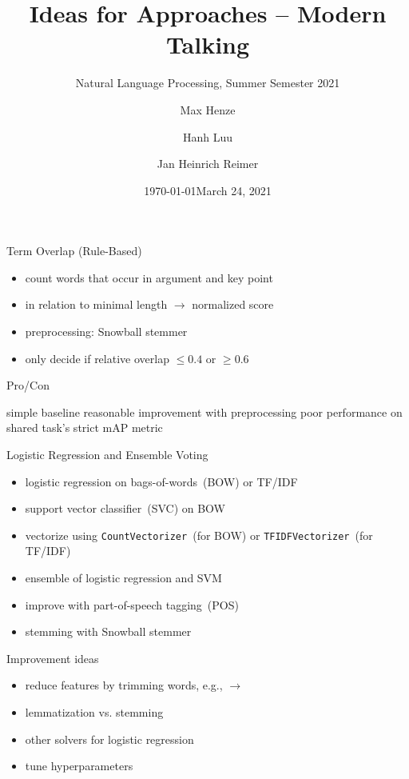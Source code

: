 \documentclass[english,handout]{mlutalk}
\title{Ideas for Approaches -- Modern Talking}
\subtitle{Natural Language Processing, Summer Semester 2021}
\author{Max Henze \and Hanh Luu \and Jan Heinrich Reimer}
\institute{Martin Luther University Halle-Wittenberg}
\date{\today}
\date{March 24, 2021}
\newcommand{\TFIDF}{\mbox{TF/IDF}\xspace}
\newcommand{\mAP}{\mbox{mAP}\xspace}
\begin{document}
\titleframe

\begin{frame}{Term Overlap (Rule-Based)}
  \begin{itemize}
    \item count words that occur in argument and key point
    \item in relation to minimal length \(\to\) normalized score
    \item preprocessing: Snowball stemmer~\cite{Porter1980}
    \item only decide if relative overlap \(\leq 0.4\) or \(\geq 0.6\)
  \end{itemize}

  \begin{block}{Pro/Con}
    \begin{itemize}
      \pro simple baseline
      \pro reasonable improvement with preprocessing
      \con poor performance on shared task's strict \mAP metric
    \end{itemize}
  \end{block}
\end{frame}

\begin{frame}[allowframebreaks]{Logistic Regression and Ensemble Voting}

  \begin{itemize}
    \item logistic regression on bags-of-words~(BOW) or \TFIDF \\
    \item support vector classifier~(SVC) on BOW
    \item vectorize using \lstinline{CountVectorizer}~(for BOW) or \lstinline{TFIDFVectorizer}~(for \TFIDF)
    \item ensemble of logistic regression and SVM
    \item improve with part-of-speech tagging~(POS) %
    \item stemming with Snowball stemmer~\cite{Porter1980}
  \end{itemize}

  \begin{block}{Improvement ideas}
  \begin{itemize}
      \item reduce features by trimming words, e.g.,  \(\to\) 
      \item lemmatization vs. stemming
      \item other solvers for logistic regression
      \item tune hyperparameters
  \end{itemize}
  \end{block}
\end{frame}
\end{document}
